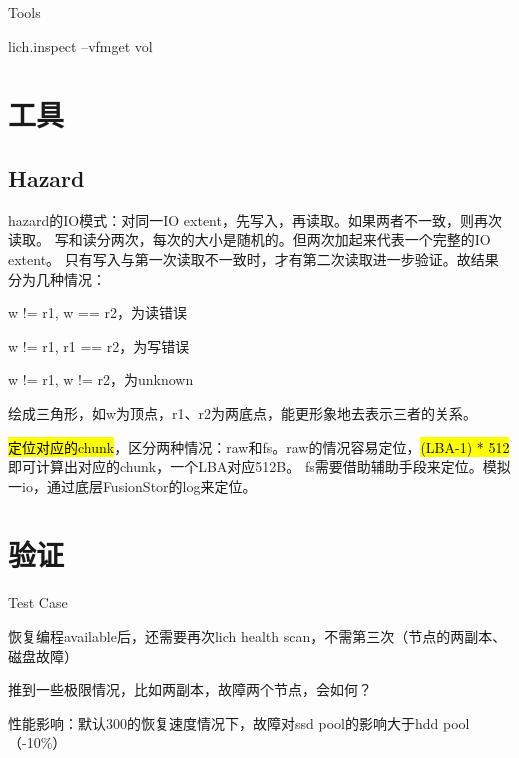 Tools
\begin{enumbox}
\item lich.inspect --vfmget vol
\end{enumbox}

\section{工具}

\subsection{Hazard}

hazard的IO模式：对同一IO extent，先写入，再读取。如果两者不一致，则再次读取。
写和读分两次，每次的大小是随机的。但两次加起来代表一个完整的IO extent。
只有写入与第一次读取不一致时，才有第二次读取进一步验证。故结果分为几种情况：
\begin{enumbox}
\item w != r1, w == r2，为读错误
\item w != r1, r1 == r2，为写错误
\item w != r1, w != r2，为unknown
\end{enumbox}

绘成三角形，如w为顶点，r1、r2为两底点，能更形象地去表示三者的关系。

\hl{定位对应的chunk}，区分两种情况：raw和fs。raw的情况容易定位，\hl{(LBA-1) * 512}即可计算出对应的chunk，一个LBA对应512B。
fs需要借助辅助手段来定位。模拟一io，通过底层FusionStor的log来定位。

\section{验证}

Test Case
\begin{enumbox}
\item 恢复编程available后，还需要再次lich health scan，不需第三次（节点的两副本、磁盘故障）
\item 推到一些极限情况，比如两副本，故障两个节点，会如何？
\item 性能影响：默认300的恢复速度情况下，故障对ssd pool的影响大于hdd pool（-10\%）
\end{enumbox}
